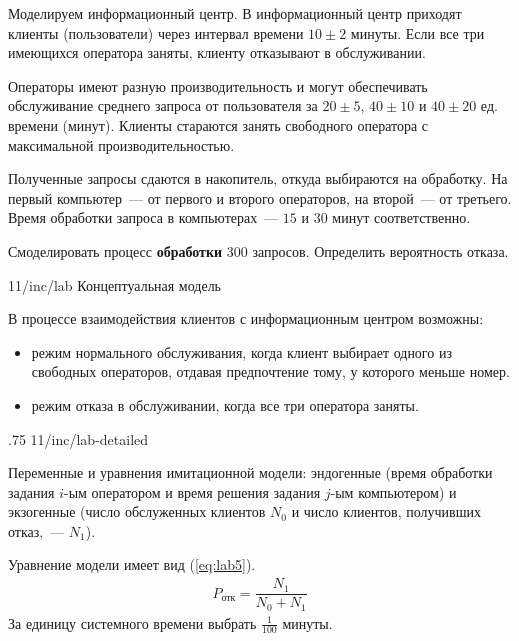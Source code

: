 Моделируем информационный центр. В информационный центр приходят клиенты (пользователи) через интервал времени ${10\pm 2}$ минуты. Если все три имеющихся оператора заняты, клиенту отказывают в обслуживании.

Операторы имеют разную производительность и могут обеспечивать обслуживание среднего запроса от пользователя за ${20\pm 5}$, ${40\pm 10}$ и ${40\pm 20}$ ед. времени (минут). Клиенты стараются занять свободного оператора с максимальной производительностью.

Полученные запросы сдаются в накопитель, откуда выбираются на обработку. На первый компьютер~--- от первого и второго операторов, на второй~--- от третьего. Время обработки запроса в компьютерах~--- $15$ и $30$ минут соответственно.

Смоделировать процесс \textbf{обработки} $300$ запросов. Определить вероятность отказа.

\image
{\textwidth}
{11/inc/lab}
{Концептуальная модель}

В процессе взаимодействия клиентов с информационным центром возможны:

\begin{itemize}
    \item режим нормального обслуживания, когда клиент выбирает одного из свободных операторов, отдавая предпочтение тому, у которого меньше номер.
    \item режим отказа в обслуживании, когда все три оператора заняты.
\end{itemize}

\image
{.75\textwidth}
{11/inc/lab-detailed}
{}

Переменные и уравнения имитационной модели: эндогенные (время обработки задания $i$-ым оператором и время решения задания $j$-ым компьютером) и экзогенные (число обслуженных клиентов $N_0$ и число клиентов, получивших отказ,~--- $N_1$).

Уравнение модели имеет вид (\ref{eq:lab5}).
%
\begin{gather}
    \label{eq:lab5}
    P_{\text{отк}} = \dfrac{N_1}{N_0 + N_1}
\end{gather}
%
За единицу системного времени выбрать $\frac{1}{100}$ минуты.